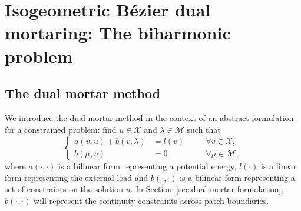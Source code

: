 \chapter{Isogeometric B\'ezier dual mortaring: The biharmonic problem}
\label{chp:chapter3}
\graphicspath{{figures/}{figures/chapter3/}}

\section{The dual mortar method}
\label{sec:dual-mortar-method}
We introduce the dual mortar method in the context of an abstract formulation for a constrained problem: find $u\in\mathcal{X}$ and $\lambda\in\mathcal{M}$ such that
\begin{equation}\label{eq:LM-form}
  \left\{\begin{alignedat}{2}
    a(v,u)+b(v,\lambda)&=l(v)\quad &&\forall{}v\in\mathcal{X},\\
    b(\mu,u)&=0\quad &&\forall{}\mu\in\mathcal{M},
  \end{alignedat}\right.
\end{equation}
where $a(\cdot,\cdot)$ is a bilinear form representing a potential energy, $l(\cdot)$ is a linear form representing the external load and $b(\cdot,\cdot)$ is a bilinear form representing a set of constraints on the solution $u$. In Section~\ref{sec:dual-mortar-formulation}, $b(\cdot,\cdot)$ will represent the continuity constraints across patch boundaries.

